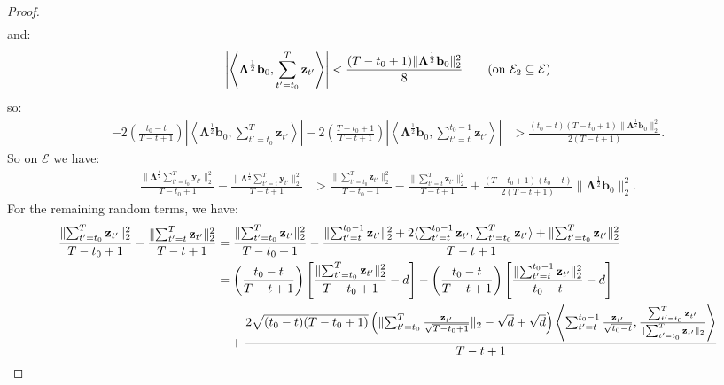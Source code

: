 \begin{proof}
\begin{align*}
\end{align*}
and:
\begin{align*}
    \left|\left\langle\boldsymbol{\Lambda}^{\frac{1}{2}}\mathbf{b}_0, \sum_{t'=t_0}^T \mathbf{z}_{t'} \right\rangle\right| < \frac{(T-t_0+1) \lVert\boldsymbol{\Lambda}^{\frac{1}{2}} \mathbf{b}_0\rVert_2^2}{8} \tag{on $\mathcal{E}_2 \subseteq \mathcal{E}$}
\end{align*}
so:
\begin{align*}
    - 2\left(\frac{t_0 - t}{T-t+1}\right)\left|\left\langle \boldsymbol{\Lambda}^{\frac{1}{2}}\mathbf{b}_0, \sum_{t'=t_0}^T\mathbf{z}_{t'}\right\rangle\right| - 2\left(\frac{T-t_0+1}{T-t+1}\right)\left|\left\langle \boldsymbol{\Lambda}^{\frac{1}{2}}\mathbf{b}_0, \sum_{t'=t}^{t_0-1}\mathbf{z}_{t'}\right\rangle\right| 
    &> \frac{(t_0-t)(T-t_0+1)\lVert\boldsymbol{\Lambda}^{\frac{1}{2}} \mathbf{b}_0\rVert_2^2}{2(T-t+1)}.
\end{align*}
So on $\mathcal{E}$ we have:
\begin{align*}
    \frac{\lVert\boldsymbol{\Lambda}^{\frac{1}{2}} \sum_{t'=t_0}^T\mathbf{y}_{t'}\rVert_2^2}{T-t_0+1} - \frac{\lVert\boldsymbol{\Lambda}^{\frac{1}{2}} \sum_{t'=t}^T\mathbf{y}_{t'}\rVert_2^2}{T-t+1} &> \frac{\lVert \sum_{t'=t_0}^T\mathbf{z}_{t'}\rVert_2^2}{T-t_0+1} - \frac{\lVert\sum_{t'=t}^T\mathbf{z}_{t'}\rVert_2^2}{T-t+1} + \frac{(T-t_0+1)(t_0 - t) }{2(T-t+1)}\lVert\boldsymbol{\Lambda}^{\frac{1}{2}} \mathbf{b}_0\rVert^2_2 .
\end{align*}
For the remaining random terms, we have:
\small
\begin{align}
    \frac{\lVert\sum_{t'=t_0}^T\mathbf{z}_{t'}\rVert_2^2}{T-t_0+1} - \frac{\lVert\sum_{t'=t}^T\mathbf{z}_{t'}\rVert_2^2}{T-t+1} &= \frac{\lVert\sum_{t'=t_0}^T\mathbf{z}_{t'}\rVert_2^2}{T-t_0+1} - 
    \frac{\lVert\sum_{t'=t}^{t_0-1}\mathbf{z}_{t'}\rVert_2^2 + 2\langle \sum_{t'=t}^{t_0-1}\mathbf{z}_{t'}, \sum_{t'=t_0}^{T}\mathbf{z}_{t'}\rangle + \lVert\sum_{t'=t_0}^{T}\mathbf{z}_{t'}\rVert_2^2}{T-t+1} \notag \\
    &= \left(\frac{t_0-t}{T-t+1}\right)\left[\frac{\lVert\sum_{t'=t_0}^T\mathbf{z}_{t'}\rVert_2^2}{T-t_0 + 1} - d\right] - \left(\frac{t_0-t}{T-t+1}\right)\left[\frac{\lVert\sum_{t'=t}^{t_0-1}\mathbf{z}_{t'}\rVert_2^2}{t_0-t} -d \right] \notag \\
    &\quad +\frac{2\sqrt{(t_0-t)(T-t_0+1)}\left(\lVert\sum_{t'=t_0}^{T}\frac{\mathbf{z}_{t'}}{\sqrt{T-t_0+1}}\rVert_2 -\sqrt{d} + \sqrt{d}\right)\left\langle \sum_{t'=t}^{t_0-1}\frac{\mathbf{z}_{t'}}{\sqrt{t_0-t}}, \frac{\sum_{t'=t_0}^{T}\mathbf{z}_{t'}}{\lVert\sum_{t'=t_0}^{T}\mathbf{z}_{t'}\rVert_2}\right\rangle}{T-t+1} \notag \\

\end{align}
\end{proof}

